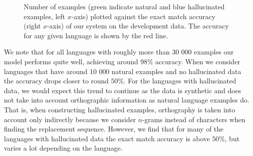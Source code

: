 \documentclass[11pt,a4paper]{article}
\begin{document}
\begin{figure}
\caption{\label{fig:data_acc} Number of examples (green indicate
natural and blue hallucinated examples, left $x$-axis) plotted against
the exact match accuracy (right $x$-axis) of our system on the
development data. The accuracy for any given language is shown by the
red line.}
\end{figure}

We note that for all languages with roughly more than 30 000 examples
our model performs quite well, achieving around $98\%$ accuracy. When
we consider languages that have around 10 000 natural examples and no
hallucinated data the accuracy drops closer to round $50\%$. For the
languages with hallucinated data, we would expect this trend to
continue as the data is synthetic and does not take into account
orthographic information as natural language examples do.  That is,
when constructing hallucinated examples, orthography is taken into
account only indirectly because we consider $n$-grams instead of
characters when finding the replacement sequence. However, we find
that for many of the languages with hallucinated data the exact match
accuracy is above $50\%$, but varies a lot depending on the language.
\end{document}

